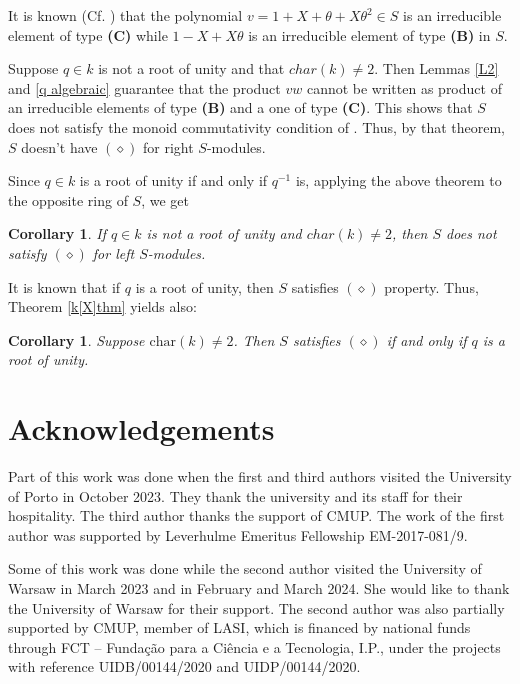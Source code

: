\documentclass[a4paper, 11pt]{article}
\newtheorem{corollary}[theorem]{Corollary}
\theoremstyle{definition}
\begin{document}
\bigskip

 It is known (Cf. \cite[Example 6.9]{BCM2}) that the  polynomial $v=1+X+\theta+X\theta^2\in S$ is an irreducible element of  type {\bf{(C)}} while $1-X+X\theta$ is an irreducible element of type {\bf{(B)}} in $S$.

Suppose   $q\in k$ is not a root of unity and that $char(k)\neq 2$. Then Lemmas \ref{L2} and \ref{q algebraic} guarantee that the product $vw$ cannot be written as product of an irreducible elements of type {\bf{(B)}} and a one of type {\bf{(C)}}. This shows that $S$ does not satisfy the monoid commutativity  condition of \cite[Threorem 1.3(2)]{BCM2}. Thus, by that theorem, $S$   doesn't have $(\diamond)$ for right $S$-modules.

\bigskip

Since  $q\in k$ is a root of unity if and only if $q^{-1}$ is, applying the above theorem to the opposite ring of $S$, we get
\begin{corollary}
 If $q\in k$ is not a root of unity and $char(k)\neq 2$, %
 then $S$ does not satisfy  $(\diamond)$ for left $S$-modules.
\end{corollary}
It is known that if $q$ is a root of unity, then $S$ satisfies $(\diamond)$ property. Thus, Theorem  \ref{k[X]thm} yields also:
\begin{corollary}
Suppose $\mathrm{char}(k)\neq 2$. Then  $S$   satisfies $(\diamond)$   if and only if $q$ is a root of unity.
\end{corollary}



\bigskip


\section*{Acknowledgements}{ }

Part of this work was done when the first and third authors visited the University of Porto in October 2023. They thank the university and its staff for their hospitality. The third author thanks the support of CMUP. The work of the first author was supported by Leverhulme Emeritus Fellowship EM-2017-081/9.

Some of this work was done while the second author visited the University of Warsaw in March 2023 and in February and March 2024. She would like to thank the University of Warsaw for their support. The second author was also partially supported by CMUP, member of LASI, which is financed by national funds through FCT – Funda\c{c}\~ao para a Ci\^encia e a Tecnologia, I.P., under the projects with reference UIDB/00144/2020 and UIDP/00144/2020.
\end{document}
